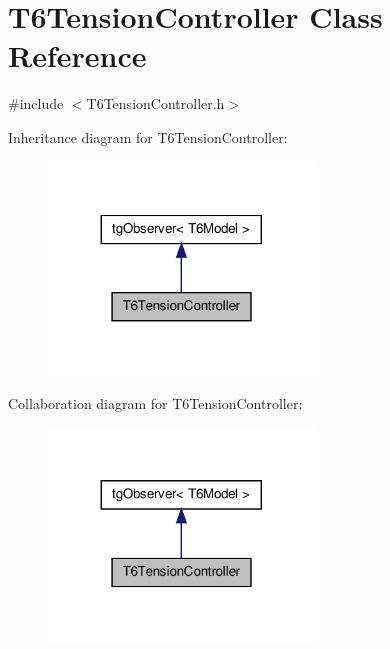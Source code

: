 \hypertarget{class_t6_tension_controller}{\section{T6\-Tension\-Controller Class Reference}
\label{class_t6_tension_controller}
}


{\ttfamily \#include $<$T6\-Tension\-Controller.\-h$>$}



Inheritance diagram for T6\-Tension\-Controller\-:\nopagebreak
\begin{figure}[H]
\begin{center}
\leavevmode
\includegraphics[width=200pt]{class_t6_tension_controller__inherit__graph}
\end{center}
\end{figure}


Collaboration diagram for T6\-Tension\-Controller\-:\nopagebreak
\begin{figure}[H]
\begin{center}
\leavevmode
\includegraphics[width=200pt]{class_t6_tension_controller__coll__graph}
\end{center}
\end{figure}
